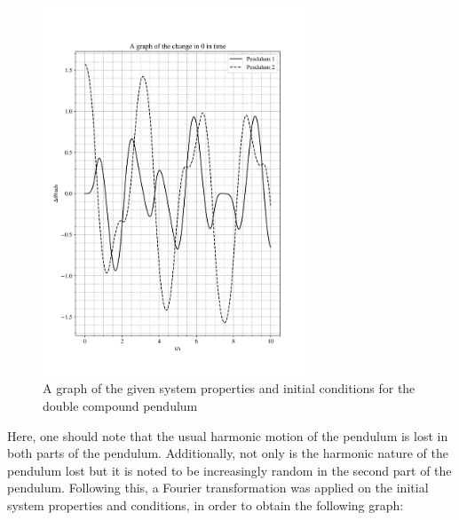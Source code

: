 \documentclass[12pt, a4paper]{article}
\begin{document}
\begin{figure}[H]
    \centering
    \includegraphics[width = 0.7\textwidth]{plots/Plot 3.1.png}\caption{A graph of the given system properties and initial conditions for the double compound pendulum}\label{fig: pendulum 2.1}
\end{figure}

Here, one should note that the usual harmonic motion of the pendulum is lost in both parts of the pendulum. Additionally, not only is the harmonic nature of the pendulum lost but it is noted to be increasingly random in the second part of the pendulum. Following this, a Fourier transformation was applied on the initial system properties and conditions, in order to obtain the following graph:
\end{document}
